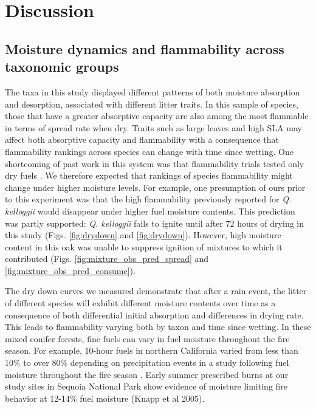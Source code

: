 \documentclass[letterpaper,12pt]{article}
\begin{document}
\section*{Discussion}

\subsection*{Moisture dynamics and flammability across taxonomic groups}

The taxa in this study displayed different patterns of both moisture absorption
and desorption, associated with different litter traits. In this sample of
species, those that have a greater absorptive capacity are also among the most
flammable in terms of spread rate when dry. Traits such as large leaves and
high SLA may affect both absorptive capacity and flammability with a
consequence that flammability rankings across species can change with time
since wetting. One shortcoming of past work in this system was that
flammability trials tested only dry fuels \citep{Magalhaes+Schwilk-2012}. We
therefore expected that rankings of species flammability might change under
higher moisture levels. For example, one presumption of ours prior to this
experiment was that the high flammability previously reported for \emph{Q.
  kelloggii} \citep{Magalhaes+Schwilk-2012} would disappear under higher fuel
moisture contents. This prediction was partly supported: \emph{Q. kelloggii}
fails to ignite until after 72 hours of drying in this study (Figs.
\ref{fig:drydown} and \ref{fig:drydown}). However, high moisture
content in this oak was unable to suppress ignition of mixtures to which it
contributed (Figs. \ref{fig:mixture_obs_pred_spread} and
\ref{fig:mixture_obs_pred_consume}).

The dry down curves we measured demonstrate that after a rain event, the litter
of different species will exhibit different moisture contents over time as a
consequence of both differential initial absorption and differences in drying
rate. This leads to flammability varying both by taxon and time since wetting.
In these mixed conifer forests, fine fuels can vary in fuel moisture throughout
the fire season. For example, 10-hour fuels in northern California varied from
less than 10\% to over 80\% depending on precipitation events in a study
following fuel moisture throughout the fire season
\citep{Estes+Knapp+etal-2012}. Early summer prescribed burns at our study sites
in Sequoia National Park show evidence of moisture limiting fire behavior at
12-14\% fuel moisture (Knapp et al 2005).
\end{document}
